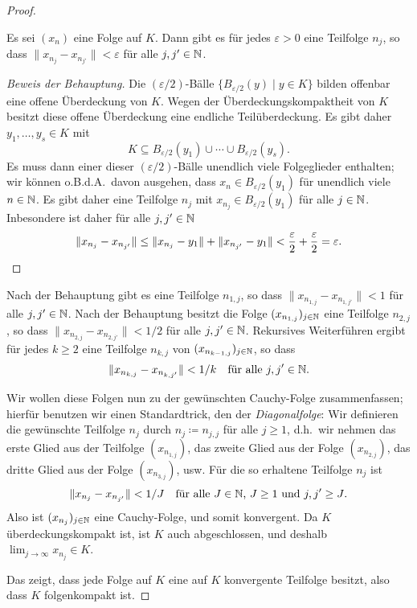 \documentclass[a4paper,10pt]{article}
\begin{document}
\begin{proof}
 \begin{beh}
  Es sei $(x_n)$ eine Folge auf $K$. Dann gibt es für jedes $\varepsilon > 0$ eine Teilfolge $n_j$, so dass $\|x_{n_j} - x_{n_{j'}}\| < \varepsilon$ für alle $j, j' \in \mathbb{N}$.
 \end{beh}
 \begin{proof}[Beweis der Behauptung]
  Die $(\varepsilon/2)$-Bälle $\{B_{\varepsilon/2}(y) \mid y \in K\}$ bilden offenbar eine offene Überdeckung von $K$. Wegen der Überdeckungskompaktheit von $K$ besitzt diese offene Überdeckung eine endliche Teilüberdeckung. Es gibt daher $y_1, \dotsc, y_s \in K$ mit
  \[
   K \subseteq B_{\varepsilon/2}(y_1) \cup \dotsb \cup B_{\varepsilon/2}(y_s).
  \]
  Es muss dann einer dieser $(\varepsilon/2)$-Bälle unendlich viele Folgeglieder enthalten; wir können o.B.d.A.\ davon ausgehen, dass $x_n \in B_{\varepsilon/2}(y_1)$ für unendlich viele $n \in \mathbb{N}$. Es gibt daher eine Teilfolge $n_j$ mit $x_{n_j} \in B_{\varepsilon/2}(y_1)$ für alle $j \in \mathbb{N}$. Inbesondere ist daher für alle $j, j' \in \mathbb{N}$
  \[
   \|x_{n_j} - x_{n_{j'}}\|
   \leq \|x_{n_j} - y_1\| + \|x_{n_{j'}} - y_1\|
   < \frac{\varepsilon}{2} + \frac{\varepsilon}{2}
   = \varepsilon.
   \qedhere
  \]
 \end{proof}
 
 Nach der Behauptung gibt es eine Teilfolge $n_{1,j}$, so dass $\|x_{n_{1,j}}-x_{n_{1,j'}}\| < 1$ für alle $j, j' \in \mathbb{N}$. Nach der Behauptung besitzt die Folge $(x_{n_{1,j}})_{j \in \mathbb{N}}$ eine Teilfolge $n_{2,j}$, so dass $\|x_{n_{2,j}} - x_{n_{2,j'}}\| < 1/2$ für alle $j, j' \in \mathbb{N}$. Rekursives Weiterführen ergibt für jedes $k \geq 2$ eine Teilfolge $n_{k,j}$ von $(x_{n_{k-1,j}})_{j \in \mathbb{N}}$, so dass
 \[
  \|x_{n_{k,j}} - x_{n_{k,j'}}\| < 1/k \quad \text{für alle $j, j' \in \mathbb{N}$}.
 \]
 
 Wir wollen diese Folgen nun zu der gewünschten Cauchy-Folge zusammenfassen; hierfür benutzen wir einen Standardtrick, den der \emph{Diagonalfolge}: Wir definieren die gewünschte Teilfolge $n_j$ durch $n_j \coloneqq n_{j,j}$ für alle $j \geq 1$, d.h.\ wir nehmen das erste Glied aus der Teilfolge $(x_{n_{1,j}})$, das zweite Glied aus der Folge $(x_{n_{2,j}})$, das dritte Glied aus der Folge $(x_{n_{3,j}})$, usw. Für die so erhaltene Teilfolge $n_j$ ist
 \[
  \| x_{n_j} - x_{n_{j'}} \| < 1/J \quad \text{für alle $J \in \mathbb{N}$, $J \geq 1$ und $j, j' \geq J$}.
 \]
 Also ist $(x_{n_j})_{j \in \mathbb{N}}$ eine Cauchy-Folge, und somit konvergent. Da $K$ überdeckungskompakt ist, ist $K$ auch abgeschlossen, und deshalb $\lim_{j \to \infty} x_{n_j} \in K$.
 
 Das zeigt, dass jede Folge auf $K$ eine auf $K$ konvergente Teilfolge besitzt, also dass $K$ folgenkompakt ist.
\end{proof}
\end{document}
